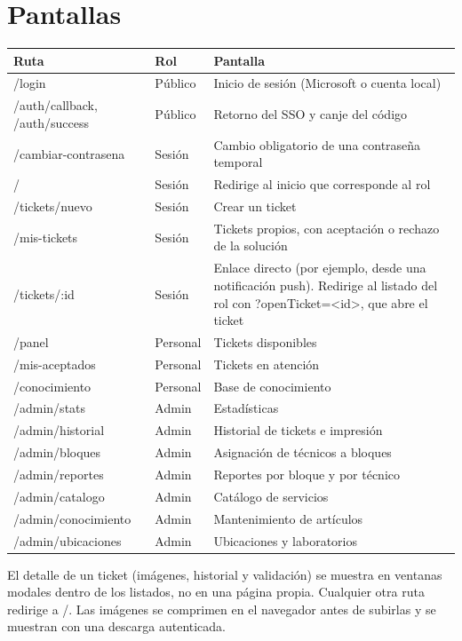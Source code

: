 \documentclass[11pt,a4paper,oneside]{report}
\newcommand{\codus}{\textunderscore\allowbreak}
\DeclareRobustCommand{\cod}[1]{{\small\ttfamily\let\_\codus #1}}
\newcommand{\cabecera}{\rowcolor{utaRojo!12}}
\begin{document}
\section{Pantallas}
\begin{longtable}{@{}P{4.3cm}P{2.3cm}p{8.0cm}@{}}
\toprule
\cabecera \textbf{Ruta} & \textbf{Rol} & \textbf{Pantalla} \\
\midrule
\endhead
\cod{/login} & Público & Inicio de sesión (Microsoft o cuenta local) \\
\cod{/auth/callback}, \cod{/auth/success} & Público & Retorno del SSO y canje del código \\
\cod{/cambiar-contrasena} & Sesión & Cambio obligatorio de una contraseña temporal \\
\cod{/} & Sesión & Redirige al inicio que corresponde al rol \\
\cod{/tickets/nuevo} & Sesión & Crear un ticket \\
\cod{/mis-tickets} & Sesión & Tickets propios, con aceptación o rechazo de la solución \\
\cod{/tickets/:id} & Sesión & Enlace directo (por ejemplo, desde una notificación push). Redirige al listado del rol con \cod{?openTicket=<id>}, que abre el ticket \\
\cod{/panel} & Personal & Tickets disponibles \\
\cod{/mis-aceptados} & Personal & Tickets en atención \\
\cod{/conocimiento} & Personal & Base de conocimiento \\
\cod{/admin/stats} & Admin & Estadísticas \\
\cod{/admin/historial} & Admin & Historial de tickets e impresión \\
\cod{/admin/bloques} & Admin & Asignación de técnicos a bloques \\
\cod{/admin/reportes} & Admin & Reportes por bloque y por técnico \\
\cod{/admin/catalogo} & Admin & Catálogo de servicios \\
\cod{/admin/conocimiento} & Admin & Mantenimiento de artículos \\
\cod{/admin/ubicaciones} & Admin & Ubicaciones y laboratorios \\
\bottomrule
\end{longtable}

El detalle de un ticket (imágenes, historial y validación) se muestra en ventanas modales dentro de
los listados, no en una página propia. Cualquier otra ruta redirige a \cod{/}. Las imágenes se
comprimen en el navegador antes de subirlas y se muestran con una descarga autenticada.
\end{document}
